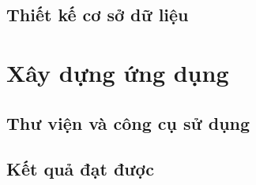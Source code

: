\subsection*{Thiết kế cơ sở dữ liệu}
\label{subsec:tk-csdl}
\label{sec:tk-csdl}
\label{sec:onoffchain}
%
%

\section{Xây dựng ứng dụng}
\label{sec:xaydung}

\subsection*{Thư viện và công cụ sử dụng}
\label{sec:moitruong}

\BangCongNghe

\HinhCauTrucMa

\subsection*{Kết quả đạt được}
\label{subsec:ketquadatduoc}
\label{sec:caidat-hopdong}
\label{sec:caidat-backend}

